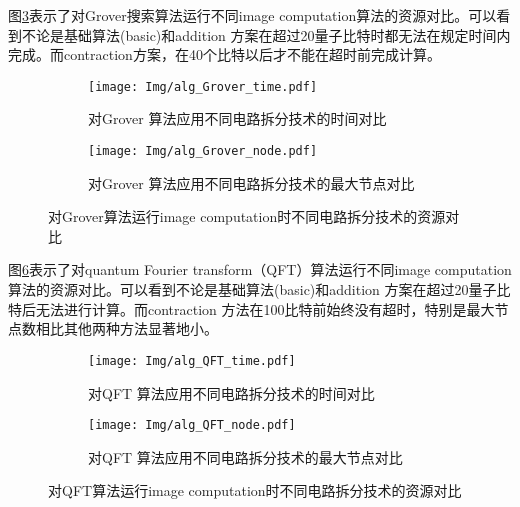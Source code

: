 图\ref{fig:grover-compare}表示了对Grover搜索算法运行不同image computation算法的资源对比。可以看到不论是基础算法(basic)和addition 方案在超过20量子比特时都无法在规定时间内完成。而contraction方案，在40个比特以后才不能在超时前完成计算。
\begin{figure}[!htbp]
    \centering
    \begin{subfigure}[b]{.4\textwidth}
        \centering
        \texttt{[image: Img/alg\_Grover\_time.pdf]}
        \caption{对Grover 算法应用不同电路拆分技术的时间对比}
        \label{fig:grover-time}
    \end{subfigure}
    \qquad
    \begin{subfigure}[b]{.4\textwidth}
        \centering
        \texttt{[image: Img/alg\_Grover\_node.pdf]}
        \caption{对Grover 算法应用不同电路拆分技术的最大节点对比}
        \label{fig:grover-node}
    \end{subfigure}
    
    \caption{对Grover算法运行image computation时不同电路拆分技术的资源对比}
    \label{fig:grover-compare}
\end{figure}

图\ref{fig:QFT-compare}表示了对quantum Fourier transform（QFT）算法运行不同image computation算法的资源对比。可以看到不论是基础算法(basic)和addition 方案在超过20量子比特后无法进行计算。而contraction 方法在100比特前始终没有超时，特别是最大节点数相比其他两种方法显著地小。
\begin{figure}[!htbp]
    \centering
    \begin{subfigure}[b]{.4\textwidth}
        \centering
        \texttt{[image: Img/alg\_QFT\_time.pdf]}
        \caption{对QFT 算法应用不同电路拆分技术的时间对比}
        \label{fig:QFT-time}
    \end{subfigure}
    \qquad
    \begin{subfigure}[b]{.4\textwidth}
        \centering
        \texttt{[image: Img/alg\_QFT\_node.pdf]}
        \caption{对QFT 算法应用不同电路拆分技术的最大节点对比}
        \label{fig:QFT-node}
    \end{subfigure}
    \caption{对QFT算法运行image computation时不同电路拆分技术的资源对比}
    \label{fig:QFT-compare}
\end{figure}

